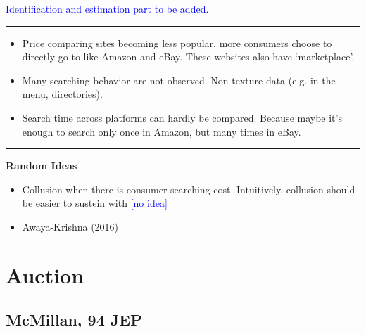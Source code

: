 \documentclass{book}
\theoremstyle{plain}
\theoremstyle{definition}
\newcommand{\myline}{\vspace{3mm} \hrule \vspace{4mm}}
\begin{document}
\textcolor{blue}{Identification and estimation part to be added.}






\myline

\textbf{}

\begin{itemize}
	\item Price comparing sites becoming less popular,
	more consumers choose to directly go to like Amazon and eBay.
	These websites also have `marketplace'.
	\item Many searching behavior are not observed. Non-texture data (e.g. in the menu, directories).
	\item Search time across platforms can hardly be compared.
	Because maybe it's enough to search only once in Amazon, 
	but many times in eBay.
\end{itemize}

\myline

\noindent
\textbf{Random Ideas}
\begin{itemize}
	\item Collusion when there is consumer searching cost.
	Intuitively, collusion should be easier to sustein with 
	\textcolor{blue}{[no idea]}

	\item Awaya-Krishna (2016) 
\end{itemize}




\chapter{Auction} %
\label{cha:auction}


\section{McMillan, 94 JEP} %
\label{sec:mcmillan_94_jep}

\textbf{}
\end{document}
